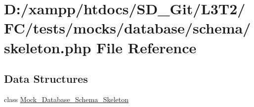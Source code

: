 \hypertarget{skeleton_8php}{}\section{D\+:/xampp/htdocs/\+S\+D\+\_\+\+Git/\+L3\+T2/\+F\+C/tests/mocks/database/schema/skeleton.php File Reference}
\label{skeleton_8php}
\subsection*{Data Structures}
\begin{DoxyCompactItemize}
\item 
class \hyperlink{class_mock___database___schema___skeleton}{Mock\+\_\+\+Database\+\_\+\+Schema\+\_\+\+Skeleton}
\end{DoxyCompactItemize}
